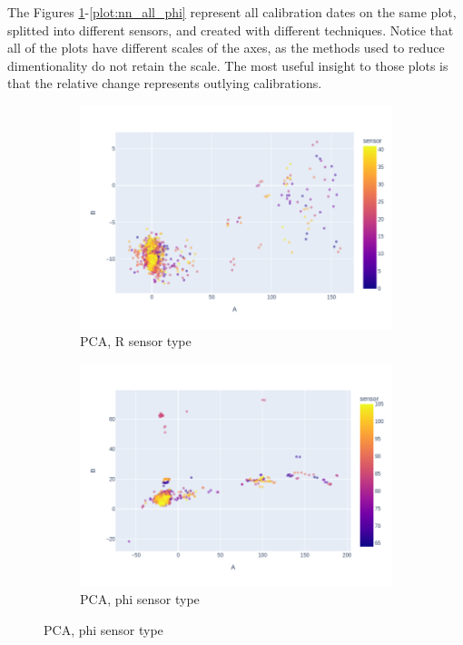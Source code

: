   The Figures \ref{plot:pca_all_r}-\ref{plot:nn_all_phi} represent all calibration dates on the same plot, splitted into different sensors, and created with different techniques. Notice that all of the plots have different scales of the axes, as the methods used to reduce dimentionality do not retain the scale. The most useful insight to those plots is that the relative change represents outlying calibrations.

\begin{figure}
\centering
\begin{subfigure}[b]{0.45\textwidth}
    \centering
    \includegraphics[width=\linewidth]{figures/chapter4/dimred/PCA_module_R_all.png}
\caption{PCA, R sensor type}
   \label{plot:pca_all_r}
  \end{subfigure}
\begin{subfigure}[b]{0.45\textwidth}
    \centering
    \includegraphics[width=\linewidth]{figures/chapter4/dimred/PCA_module_phi_all.png}
\caption{PCA, phi sensor type}
   \label{plot:pca_all_phi}
  \end{subfigure}



\end{figure}
